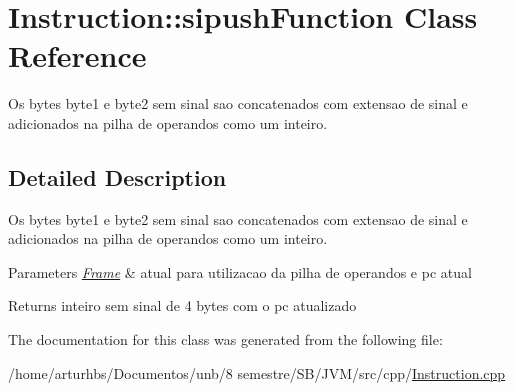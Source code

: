 \hypertarget{classInstruction_1_1sipushFunction}{}\section{Instruction\+:\+:sipush\+Function Class Reference}
\label{classInstruction_1_1sipushFunction}


Os bytes byte1 e byte2 sem sinal sao concatenados com extensao de sinal e adicionados na pilha de operandos como um inteiro.  




\subsection{Detailed Description}
Os bytes byte1 e byte2 sem sinal sao concatenados com extensao de sinal e adicionados na pilha de operandos como um inteiro. 


\begin{DoxyParams}{Parameters}
{\em \hyperlink{classFrame}{Frame}} & atual para utilizacao da pilha de operandos e pc atual \\
\hline
\end{DoxyParams}
\begin{DoxyReturn}{Returns}
inteiro sem sinal de 4 bytes com o pc atualizado 
\end{DoxyReturn}


The documentation for this class was generated from the following file\+:\begin{DoxyCompactItemize}
\item 
/home/arturhbs/\+Documentos/unb/8 semestre/\+S\+B/\+J\+V\+M/src/cpp/\hyperlink{Instruction_8cpp}{Instruction.\+cpp}\end{DoxyCompactItemize}
